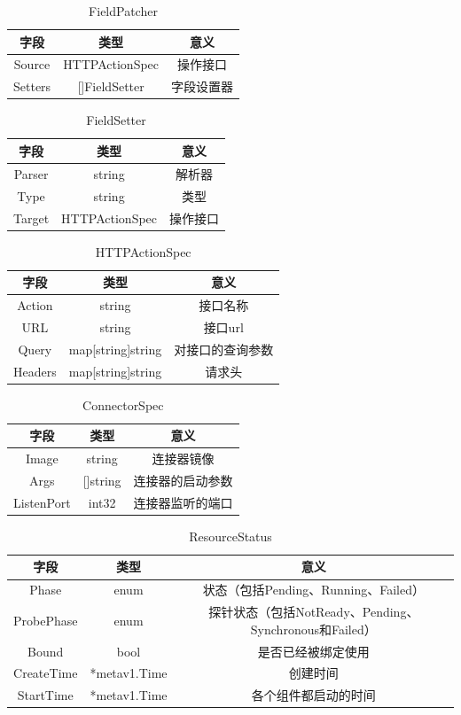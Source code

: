 \documentclass[a4paper, 12pt]{article}
\theoremstyle{definition}
\begin{document}
\begin{table}[!htbp]
\centering
\begin{tabular}{ccc}
  \toprule
  字段& 类型& 意义\\
  \midrule
  Source& HTTPActionSpec& 操作接口\\
  Setters& []FieldSetter& 字段设置器\\
  \bottomrule
\end{tabular}
\caption{FieldPatcher}
\end{table}

\begin{table}[!htbp]
\centering
\begin{tabular}{ccc}
  \toprule
  字段& 类型& 意义\\
  \midrule
  Parser& string& 解析器\\
  Type& string& 类型\\
  Target& HTTPActionSpec& 操作接口\\
  \bottomrule
\end{tabular}
\caption{FieldSetter}
\end{table}

\begin{table}[!htbp]
\centering
\begin{tabular}{ccc}
  \toprule
  字段& 类型& 意义\\
  \midrule
  Action& string& 接口名称\\
  URL& string& 接口url\\
  Query& map[string]string& 对接口的查询参数\\
  Headers& map[string]string& 请求头\\
  \bottomrule
\end{tabular}
\caption{HTTPActionSpec}
\end{table}

\begin{table}[!htbp]
\centering
\begin{tabular}{ccc}
  \toprule
  字段& 类型& 意义\\
  \midrule
  Image& string& 连接器镜像\\
  Args& []string& 连接器的启动参数\\
  ListenPort& int32& 连接器监听的端口\\
  \bottomrule
\end{tabular}
\caption{ConnectorSpec}
\end{table}

\begin{table}[!htbp]
\centering
\begin{tabular}{ccc}
  \toprule
  字段& 类型& 意义\\
  \midrule
  Phase& enum& 状态（包括Pending、Running、Failed）\\
  ProbePhase& enum& 探针状态（包括NotReady、Pending、Synchronous和Failed）\\
  Bound& bool& 是否已经被绑定使用\\
  CreateTime& *metav1.Time& 创建时间\\
  StartTime& *metav1.Time& 各个组件都启动的时间\\
  \bottomrule
\end{tabular}
\caption{ResourceStatus}
\end{table}
\end{document}

